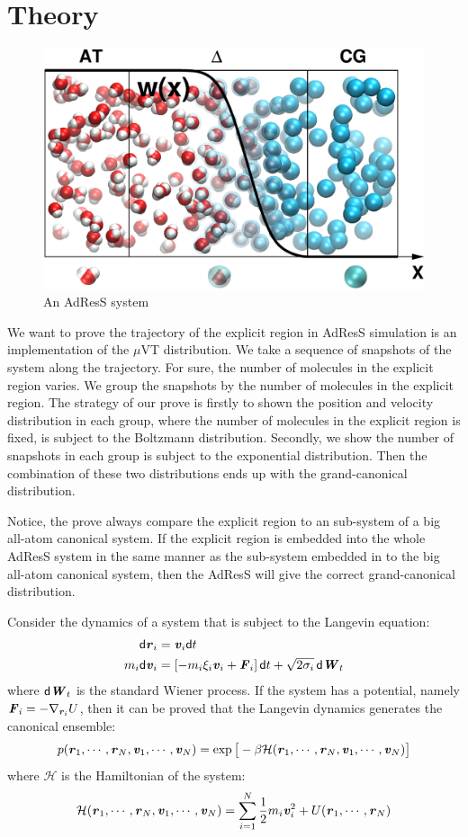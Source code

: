 \documentclass[aps,pre,preprint,unsortedaddress]{revtex4}
\renewcommand{\v}[1]{\textbf{\textit{#1}}}
\renewcommand{\d}[1]{\textsf{#1}}
\begin{document}
\section{Theory}\label{sec:theory}


\begin{figure}
  \centering
  \includegraphics[width=.5\textwidth]{fig.3/system/system.eps}
  \caption{An AdResS system}
  \label{fig:tmp1}
\end{figure}


We want to prove the trajectory of the explicit region in AdResS
simulation is an implementation of the $\mu$VT distribution. We take a
sequence of snapshots of the system along the trajectory.  For sure,
the number of molecules in the explicit region varies. We group the
snapshots by the number of molecules in the explicit region.  The
strategy of our prove is firstly to shown the position and
velocity distribution in each group, where the number of molecules
in the explicit region is fixed, is subject to the Boltzmann
distribution. Secondly, we show the number of snapshots in each group
is subject to the exponential distribution. Then the combination of
these two distributions ends up with the grand-canonical distribution.

Notice, the prove always compare the explicit region to an sub-system
of a big all-atom canonical system. If the explicit region is embedded
into the whole AdResS system in the same manner as the sub-system
embedded in to the big all-atom canonical system, then the AdResS will
give the correct grand-canonical distribution.


Consider the dynamics of a system that is subject to the Langevin equation:
\begin{align}
  \d d\v r_i &= \v v_i\d dt\\
  m_i\d d\v v_i &= [-m_i\xi_i\v v_i + \v F_i]\,\d dt + \sqrt{2\sigma_i}\,\d d\v W_t
\end{align}
where $\d d\v W_t$ is the standard Wiener process.  If the system has a
potential, namely $\v F_i = -\nabla_{\v r_i}U$, then it can be proved that the
Langevin dynamics generates the canonical ensemble:
\begin{align}
  p(\v r_1, \cdots, \v r_N, \v v_1, \cdots, \v v_N)
  = \exp\big[
  -\beta \mathcal H(\v r_1, \cdots, \v r_N, \v v_1, \cdots, \v v_N)
  \big]
\end{align}
where $\mathcal H$ is the Hamiltonian of the system:
\begin{align}
  \mathcal H(\v r_1, \cdots, \v r_N, \v v_1, \cdots, \v v_N)
  =
  \sum_{i=1}^N\frac12 m_i\v v_i^2 + U(\v r_1, \cdots, \v r_N)  
\end{align}
\end{document}

